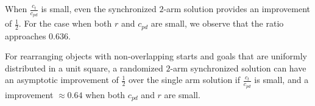 When $\frac{c_t}{c_{pd}}$ is small, even the synchronized $2$-arm solution provides an improvement of $\frac{1}{2}$. For the case when both $r$ and $c_{pd}$ are small, we observe that the ratio approaches $0.636$. 
\begin{theorem}
For rearranging objects with non-overlapping starts and goals that are 
uniformly distributed in a unit square,  a randomized $2$-arm synchronized solution can have an 
asymptotic improvement of $\frac{1}{2}$ over the single arm solution if $\frac{c_t}{c_{pd}}$ is small, and a improvement $\approx 0.64$ when both $c_{pd}$ and $r$ are small. 
\end{theorem}






